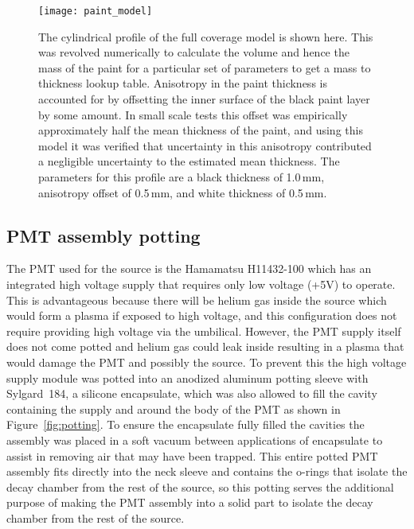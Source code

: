 \begin{figure}[h!]
\centering
\texttt{[image: paint\_model]}
\caption{The cylindrical profile of the full coverage model is shown here. This was revolved numerically to calculate the volume and hence the mass of the paint for a particular set of parameters to get a mass to thickness lookup table. Anisotropy in the paint thickness is accounted for by offsetting the inner surface of the black paint layer by some amount. In small scale tests this offset was empirically approximately half the mean thickness of the paint, and using this model it was verified that uncertainty in this anisotropy contributed a negligible uncertainty to the estimated mean thickness. The parameters for this profile are a black thickness of 1.0\,mm, anisotropy offset of 0.5\,mm, and white thickness of 0.5\,mm. }
\label{fig:surfacemodel}
\end{figure}

\subsection{PMT assembly potting}
The PMT used for the source is the Hamamatsu H11432-100 which has an integrated high voltage supply that requires only low voltage (+5V) to operate. This is advantageous because there will be helium gas inside the source which would form a plasma if exposed to high voltage, and this configuration does not require providing high voltage via the umbilical. However, the PMT supply itself does not come potted and helium gas could leak inside resulting in a plasma that would damage the PMT and possibly the source. To prevent this the high voltage supply module was potted into an anodized aluminum potting sleeve with Sylgard~184, a silicone encapsulate, which was also allowed to fill the cavity containing the supply and around the body of the PMT as shown in Figure~\ref{fig:potting}. To ensure the encapsulate fully filled the cavities the assembly was placed in a soft vacuum between applications of encapsulate to assist in removing air that may have been trapped. This entire potted PMT assembly fits directly into the neck sleeve and contains the o-rings that isolate the decay chamber from the rest of the source, so this potting serves the additional purpose of making the PMT assembly into a solid part to isolate the decay chamber from the rest of the source. 

